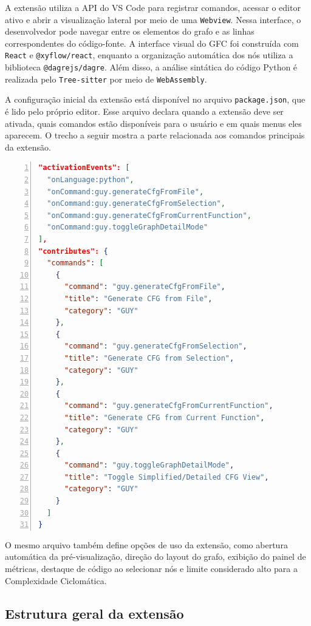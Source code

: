 A extensão utiliza a API do VS Code para registrar comandos, acessar o editor ativo e abrir a visualização lateral por meio de uma \texttt{Webview}. Nessa interface, o desenvolvedor pode navegar entre os elementos do grafo e as linhas correspondentes do código-fonte. A interface visual do GFC foi construída com \texttt{React} e \texttt{@xyflow/react}, enquanto a organização automática dos nós utiliza a biblioteca \texttt{@dagrejs/dagre}. Além disso, a análise sintática do código Python é realizada pelo \texttt{Tree-sitter} por meio de \texttt{WebAssembly}.

A configuração inicial da extensão está disponível no arquivo \texttt{package.json}, que é lido pelo próprio editor. Esse arquivo declara quando a extensão deve ser ativada, quais comandos estão disponíveis para o usuário e em quais menus eles aparecem. O trecho a seguir mostra a parte relacionada aos comandos principais da extensão.



\begin{lstlisting}[language=JSON, numbers=left, caption={Recorte da configuração de comandos da extensão GUY.}, label={lst:guy_package_commands}]
"activationEvents": [
  "onLanguage:python",
  "onCommand:guy.generateCfgFromFile",
  "onCommand:guy.generateCfgFromSelection",
  "onCommand:guy.generateCfgFromCurrentFunction",
  "onCommand:guy.toggleGraphDetailMode"
],
"contributes": {
  "commands": [
    {
      "command": "guy.generateCfgFromFile",
      "title": "Generate CFG from File",
      "category": "GUY"
    },
    {
      "command": "guy.generateCfgFromSelection",
      "title": "Generate CFG from Selection",
      "category": "GUY"
    },
    {
      "command": "guy.generateCfgFromCurrentFunction",
      "title": "Generate CFG from Current Function",
      "category": "GUY"
    },
    {
      "command": "guy.toggleGraphDetailMode",
      "title": "Toggle Simplified/Detailed CFG View",
      "category": "GUY"
    }
  ]
}
\end{lstlisting}

O mesmo arquivo também define opções de uso da extensão, como abertura automática da pré-visualização, direção do layout do grafo, exibição do painel de métricas, destaque de código ao selecionar nós e limite considerado alto para a Complexidade Ciclomática.

\subsection{Estrutura geral da extensão}

